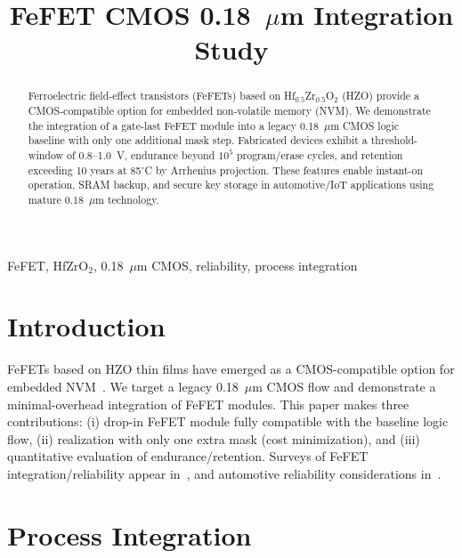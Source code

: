 \documentclass[conference]{IEEEtran}
\begin{document}
\title{FeFET CMOS 0.18~$\mu$m Integration Study}

\author{
}

\maketitle

\begin{abstract}
Ferroelectric field-effect transistors (FeFETs) based on Hf$_{0.5}$Zr$_{0.5}$O$_2$ (HZO) provide a CMOS-compatible option for embedded non-volatile memory (NVM). We demonstrate the integration of a gate-last FeFET module into a legacy 0.18~$\mu$m CMOS logic baseline with only one additional mask step. Fabricated devices exhibit a threshold-window of 0.8--1.0~V, endurance beyond $10^5$ program/erase cycles, and retention exceeding 10 years at 85$^\circ$C by Arrhenius projection. These features enable instant-on operation, SRAM backup, and secure key storage in automotive/IoT applications using mature 0.18~$\mu$m technology.
\end{abstract}

\begin{IEEEkeywords}
FeFET, HfZrO$_2$, 0.18~$\mu$m CMOS, reliability, process integration
\end{IEEEkeywords}

\section{Introduction}
FeFETs based on HZO thin films have emerged as a CMOS-compatible option for embedded NVM~\cite{Boscke2011,Mueller2012,Schenk2019}. We target a legacy 0.18~$\mu$m CMOS flow and demonstrate a minimal-overhead integration of FeFET modules. This paper makes three contributions: (i) drop-in FeFET module fully compatible with the baseline logic flow, (ii) realization with only one extra mask (cost minimization), and (iii) quantitative evaluation of endurance/retention. Surveys of FeFET integration/reliability appear in~\cite{Mueller2015,Park2020}, and automotive reliability considerations in~\cite{Nakamura2003}.

\section{Process Integration}
\end{document}
